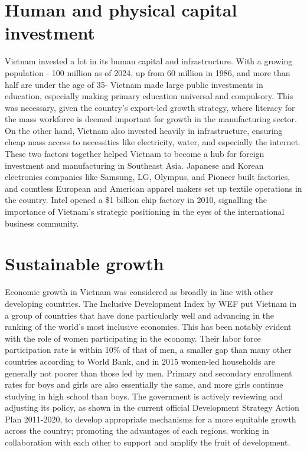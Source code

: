 \documentclass[openany]{book}
\begin{document}
\section{Human and physical capital investment}
Vietnam invested a lot in its human capital and infrastructure. With a growing population - 100 million as of 2024, up from 60 million in 1986, and more than half are under the age of 35- Vietnam made large public investments in education, especially making primary education universal and compulsory. This was necessary, given the country's export-led growth strategy, where literacy for the mass workforce is deemed important for growth in the manufacturing sector. On the other hand, Vietnam also invested heavily in infrastructure, ensuring cheap mass access to necessities like electricity, water, and especially the internet. These two factors together helped Vietnam to become a hub for foreign investment and manufacturing in Southeast Asia. Japanese and Korean electronics companies like Samsung, LG, Olympus, and Pioneer built factories, and countless European and American apparel makers set up textile operations in the country. Intel opened a \$1 billion chip factory in 2010, signalling the importance of Vietnam's strategic positioning in the eyes of the international business community.

\section{Sustainable growth}
Economic growth in Vietnam was considered as broadly in line with other developing countries. The Inclusive Development Index\cite{139} by WEF put Vietnam in a group of countries that have done particularly well and advancing in the ranking of the world's most inclusive economies. This has been notably evident with the role of women participating in the economy. Their labor force participation rate is within 10\% of that of men, a smaller gap than many other countries according to World Bank, and in 2015 women-led households are generally not poorer than those led by men. Primary and secondary enrollment rates for boys and girls are also essentially the same, and more girls continue studying in high school than boys. The government is actively reviewing and adjusting its policy, as shown in the current official Development Strategy Action Plan 2011-2020, to develop appropriate mechanisms for a more equitable growth across the country; promoting the advantages of each regions, working in collaboration with each other to support and amplify the fruit of development.
\end{document}
